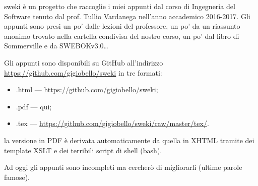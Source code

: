 sweki è un progetto che raccoglie i miei appunti dal corso di Ingegneria del Software tenuto dal prof. Tullio Vardanega nell'anno accademico 2016-2017. Gli appunti sono presi un po' dalle lezioni del professore, un po' da un riassunto anonimo trovato nella cartella condivisa del nostro corso, un po' dal libro di Sommerville e da SWEBOKv3.0\dots

Gli appunti sono disponibili su GitHub all'indirizzo \url{https://github.com/gigiobello/sweki} in tre formati:
\begin{itemize}
	\item .html --- \url{https://github.com/gigiobello/sweki};
	\item .pdf --- qui;
	\item .tex --- \url{https://github.com/gigiobello/sweki/raw/master/tex/}.
\end{itemize}

la versione in PDF è derivata automaticamente da quella in XHTML tramite dei template XSLT e dei terribili script di shell (bash).

Ad oggi gli appunti sono incompleti ma cercherò di migliorarli (ultime parole famose).
